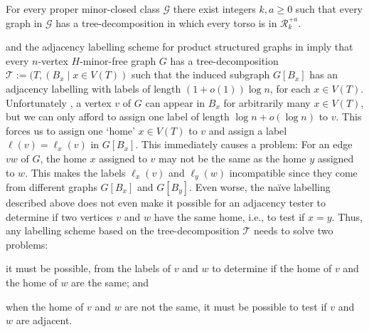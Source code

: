 \begin{thm}
  \label{gmpst}
  For every proper minor-closed class $\mathcal{G}$ there exist integers $k,a\geq 0$ such that every graph in $\mathcal{G}$ has a tree-decomposition in which every torso is in $\mathcal{R}_k^{+a}$.
\end{thm}




 
 and the adjacency labelling scheme for product structured graphs in \cite{dujmovic.esperet.ea:adjacency} imply that every $n$-vertex $H$-minor-free graph $G$ has a tree-decomposition $\mathcal{T}:=(T,(B_x\mid x\in V(T))$ such that the induced subgraph $G[B_x]$ has an adjacency labelling with labels of length $(1+o(1))\log n$, for each $x\in V(T)$.  Unfortunately , a vertex $v$ of $G$ can appear in $B_x$ for arbitrarily many $x\in V(T)$, but  we can only afford to assign one label of length $\log n+o(\log n)$ to $v$.  This forces us to assign one `home' $x\in V(T)$ to $v$ and assign a label $\ell(v)=\ell_x(v)$ in $G[B_x]$. 
This immediately causes a problem:  For an edge $vw$ of $G$, the home $x$ assigned to $v$ may not be the same as the home $y$ assigned to $w$.  This makes the labels $\ell_x(v)$ and $\ell_y(w)$ incompatible since they come from  different graphs $G[B_x]$ and $G[B_y]$.  
Even worse, the naïve labelling described above does not even make it possible for an adjacency tester to determine if two vertices $v$ and $w$ have the same home, i.e., to test if $x=y$.  Thus, any labelling scheme based on the tree-decomposition $\mathcal{T}$ needs to solve two problems: 
\begin{enumerate*}[label=(\roman*)]
  \item\label{test_homes} it must be possible, from the labels of $v$ and $w$ to determine if the home of $v$ and the home of $w$ are the same; and
  \item\label{hard_adjacency_test} when the home of $v$ and $w$ are not the same, it must be possible to test if $v$ and $w$ are adjacent.
\end{enumerate*}

